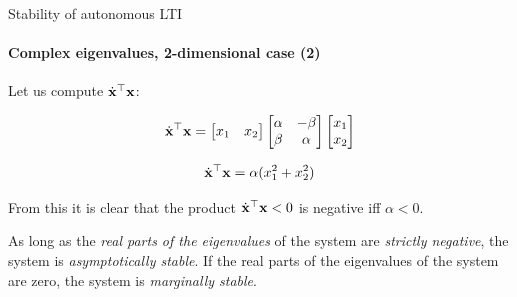 \documentclass{beamer}
\begin{document}
\begin{frame}{Stability of autonomous LTI}
\framesubtitle{Complex eigenvalues, 2-dimensional case (2)}
\begin{flushleft}

Let us compute $\dot{\mathbf{x}}^\top \mathbf{x}$:

\begin{equation}
\dot{\mathbf{x}}^\top \mathbf{x} =
\begin{bmatrix}
    x_1 & x_2
\end{bmatrix}
\begin{bmatrix}
    \alpha & -\beta \\ \beta & \alpha
\end{bmatrix}     
\begin{bmatrix}
    x_1 \\ x_2
\end{bmatrix}
\end{equation}

\begin{equation}
\dot{\mathbf{x}}^\top \mathbf{x} =
\alpha (x_1^2 + x_2^2)
\end{equation}

From this it is clear that the product $\dot{\mathbf{x}}^\top \mathbf{x} < 0$ is negative iff $\alpha < 0$.

\begin{definition}
As long as the \emph{real parts of the eigenvalues} of the system are \emph{strictly negative}, the system is \emph{asymptotically stable}. If the real parts of the eigenvalues of the system are zero, the system is \emph{marginally stable}.
\end{definition}

\end{flushleft}
\end{frame}
\end{document}

